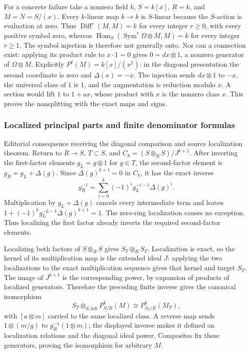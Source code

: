 For a concrete failure take a nonzero field \(k\), \(S=k[x]\), \(R=k\), and \(M=N=S/(x)\). Every \(k\)-linear map \(k\to k\) is \(S\)-linear because the \(S\)-action is evaluation at zero. Thus \(\operatorname{Diff}^r(M,M)=k\) for every integer \(r\ge0\), with every positive symbol zero, whereas \(\operatorname{Hom}_S(\operatorname{Sym}^r\Omega\otimes M,M)=k\) for every integer \(r\ge1\). The symbol injection is therefore not generally onto. Nor can a connection exist: applying its product rule to \(x\cdot1=0\) gives \(0=dx\otimes1\), a nonzero generator of \(\Omega\otimes M\). Explicitly \(P^1(M)=k[x]/(x^2)\): in the diagonal presentation the second coordinate is zero and \(\Delta(x)=-x\). The injection sends \(dx\otimes1\) to \(-x\), the universal class of \(1\) is \(1\), and the augmentation is reduction modulo \(x\). A section would lift \(1\) to \(1+ax\), whose product with \(x\) is the nonzero class \(x\). This proves the nonsplitting with the exact maps and signs.

\subsubsection{Localized principal parts and finite denominator formulas}\label{algebra-proof-043-localized-principal-parts-and-finite-denominator-formulas}

Editorial consequence receiving the diagonal comparison and source localization theorem. Return to \(R\to S\), \(T\subset S\), and \(C_k=(S\otimes_RS)/J^{k+1}\). After inverting the first-factor elements \(g_L=g\otimes1\) for \(g\in T\), the second-factor element is \(g_R=g_L+\Delta(g)\). Since \(\Delta(g)^{k+1}=0\) in \(C_k\), it has the exact inverse \[
g_R^{-1}=\sum_{i=0}^k(-1)^i g_L^{-i-1}\Delta(g)^i.
\] Multiplication by \(g_L+\Delta(g)\) cancels every intermediate term and leaves \(1+(-1)^kg_L^{-k-1}\Delta(g)^{k+1}=1\). The zero-ring localization causes no exception. Thus localizing the first factor already inverts the required second-factor elements.

Localizing both factors of \(S\otimes_RS\) gives \(S_T\otimes_RS_T\). Localization is exact, so the kernel of its multiplication map is the extended ideal \(J\): applying the two localizations to the exact multiplication sequence gives that kernel and target \(S_T\). The image of \(J^{k+1}\) is the corresponding power, by expansion of products of localized generators. Therefore the preceding finite inverse gives the canonical isomorphism \[
S_T\otimes_{S,\mathrm{left}}P^k_{S/R}(M)
\cong P^k_{S_T/R}(M_T),
\] with \([a\otimes m]\) carried to the same localized class. A reverse map sends \(1\otimes(m/g)\) to \(g_R^{-1}(1\otimes m)\); the displayed inverse makes it defined on localization relations and the diagonal ideal power. Composites fix these generators, proving the isomorphism for arbitrary \(M\).

